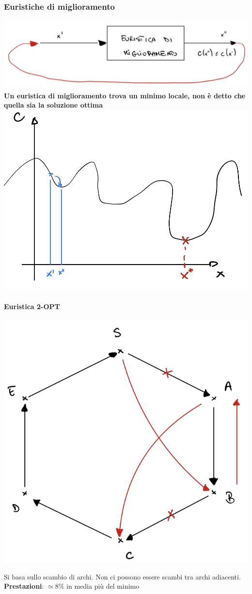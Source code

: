 \documentclass[12pt,a4paper]{article}
\begin{document}
\subsubsection{Euristiche di miglioramento}
\begin{center}
\includegraphics[width=0.6\columnwidth]{img/eur_miglioramento.jpg}\\

\SmallSep \noindent
\textbf{Un euristica di miglioramento trova un minimo locale, non è detto che quella sia la soluzione ottima}\\

\SmallSep \noindent
\includegraphics[width=0.5\columnwidth]{img/eur_miglioramento_graph.jpg}
\end{center}

\paragraph{Euristica 2-OPT}
\begin{center}
\includegraphics[width=0.4\columnwidth]{img/eur_2opt.jpeg}
\end{center}
Si basa sullo scambio di archi. Non ci possono essere scambi tra archi adiacenti.\\
\textbf{Prestazioni}: $\simeq 8\%$ in media più del minimo
\end{document}
